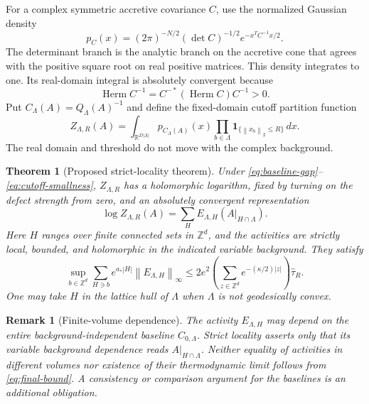 \documentclass[11pt]{article}
\newtheorem{theorem}{Theorem}
\newtheorem{remark}{Remark}
\newcommand{\Herm}{\operatorname{Herm}}
\newcommand{\Z}{\mathbb Z}
\newcommand{\R}{\mathbb R}
\newcommand{\one}{\mathbf 1}
\newcommand{\norm}[1]{\left\|#1\right\|}
\begin{document}
For a complex symmetric accretive covariance $C$, use the normalized
Gaussian density
\begin{equation}
 p_C(x)=(2\pi)^{-N/2}(\det C)^{-1/2}
                           e^{-x^TC^{-1}x/2}.
 \label{eq:density}
\end{equation}
The determinant branch is the analytic branch on the accretive cone that
agrees with the positive square root on real positive matrices. This
density integrates to one. Its real-domain integral is absolutely
convergent because
\[
 \Herm C^{-1}=C^{-*}(\Herm C)C^{-1}>0.
\]
Put $C_\Lambda(A)=Q_\Lambda(A)^{-1}$ and define the fixed-domain cutoff
partition function
\begin{equation}
 Z_{\Lambda,R}(A)=
  \int_{\R^{D|\Lambda|}}p_{C_\Lambda(A)}(x)
        \prod_{b\in\Lambda}\one_{\{\norm{x_b}_2\le R\}}\,dx.
 \label{eq:partition}
\end{equation}
The real domain and threshold do not move with the complex background.

\begin{theorem}[Proposed strict-locality theorem]\label{thm:main}
Under \eqref{eq:baseline-gap}--\eqref{eq:cutoff-smallness},
$Z_{\Lambda,R}$ has a holomorphic logarithm, fixed by turning on the
defect strength from zero, and an absolutely convergent representation
\begin{equation}
 \log Z_{\Lambda,R}(A)
       =\sum_{H}E_{\Lambda,H}(A|_{H\cap\Lambda}).
 \label{eq:local-log}
\end{equation}
Here $H$ ranges over finite connected sets in $\Z^d$, and the activities are
strictly local, bounded, and holomorphic in the indicated variable
background. They satisfy
\begin{equation}
 \sup_{b\in\Z^d}\sum_{H\ni b}
     e^{a_*|H|}\norm{E_{\Lambda,H}}_\infty
 \le
 2e^2\left(\sum_{z\in\Z^d}e^{-(\kappa/2)|z|}\right)
                     \widehat\tau_R.
 \label{eq:final-bound}
\end{equation}
One may take $H$ in the lattice hull of $\Lambda$ when $\Lambda$ is not
geodesically convex.
\end{theorem}

\begin{remark}[Finite-volume dependence]
The activity $E_{\Lambda,H}$ may depend on the entire
\emph{background-independent} baseline $C_{0,\Lambda}$. Strict locality
asserts only that its \emph{variable background dependence} reads
$A|_{H\cap\Lambda}$. Neither equality of activities in different volumes
nor existence of their thermodynamic limit follows from
\eqref{eq:final-bound}. A consistency or comparison argument for the
baselines is an additional obligation.
\end{remark}
\end{document}
